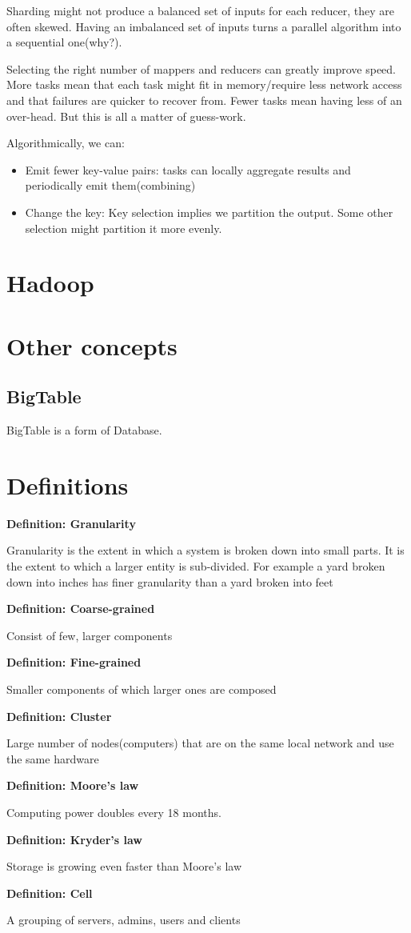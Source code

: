 \documentclass[11pt]{article}
\newcommand{\define}[2] {
  \textbf{Definition: #1}
  \begin{center} #2
\end{center}
}
\begin{document}
Sharding might not produce a balanced set of inputs for each reducer, they are often skewed. Having an imbalanced set of inputs turns a parallel algorithm into a sequential one(why?)\cite{ques}.

Selecting the right number of mappers and reducers can greatly improve speed. More tasks mean that each task might fit in memory/require less network access and that failures are quicker to recover from. Fewer tasks mean having less of an over-head. But this is all a matter of guess-work.

Algorithmically, we can:
\begin{itemize}
\item Emit fewer key-value pairs: tasks can locally aggregate results and periodically emit them(combining)
\item Change the key: Key selection implies we partition the output. Some other selection might partition it more evenly.
\end{itemize}

\section{Hadoop}


\section{Other concepts}

\subsection{BigTable}
BigTable is a form of Database.

\section{Definitions}

\define{Granularity}{Granularity is the extent in which a system is broken down into small parts. It is the extent to which a larger entity is sub-divided. For example a yard broken down into inches has finer granularity than a yard broken into feet}
\define{Coarse-grained}{Consist of few, larger components}
\define{Fine-grained}{Smaller components of which larger ones are composed}
\define{Cluster}{Large number of nodes(computers) that are on the same local network and use the same hardware}
\define{Moore's law}{Computing power doubles every 18 months.}
\define{Kryder's law}{Storage is growing even faster than Moore's law}
\define{Cell}{A grouping of servers, admins, users and clients}
\end{document}
